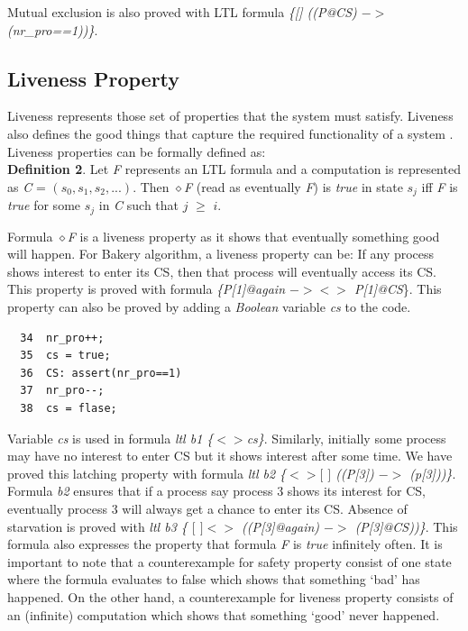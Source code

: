 \documentclass[conference]{IEEEtran}
\begin{document}
Mutual exclusion is also proved with LTL formula \emph{\{[] ((P@CS) $->$ (nr\_pro==1))\}}.

\subsection{Liveness Property}
Liveness represents those set of properties that the system must satisfy. Liveness also defines the good things that capture the 
required functionality of a system \cite{7}. Liveness properties can be formally defined as:\\
\textbf{Definition 2}. Let \emph{F} represents an LTL formula and a computation is represented as \emph{C} = $(s_0, s_1, s_2,...)$. 
Then $\diamond$\emph{F} (read as eventually \emph{F}) is \emph{true} in state $s_j$ iff \emph{F} is \emph{true} for some $s_j$ in \emph{C} such that 
$j$ $\geq$ $i$.

Formula $\diamond$\emph{F} is a liveness property as it shows that eventually something good will happen. For Bakery algorithm, a liveness property 
can be: If any process shows interest to enter its CS, then that process will eventually access its CS. This property is proved with 
formula \emph{\{P[1]@again  $-> <>$ P[1]@CS}\}. This property can also be proved by adding a \emph{Boolean} variable \emph{cs} to the code.
{\small \begin{verbatim}
  34  nr_pro++;
  35  cs = true;
  36  CS: assert(nr_pro==1)
  37  nr_pro--;
  38  cs = flase; 
\end{verbatim}}

Variable \emph{cs} is used in formula \emph{ltl b1 \{$<>$cs\}}. Similarly, initially some process may have no interest to enter CS but it shows 
interest after some time. We have proved this latching property with formula \emph{ltl b2 \{$<>[$ $]$ ((P[3]\@again) $->$ (p[3]\@CS))\}}. Formula 
\emph{b2} ensures that if a process say process 3 shows its interest for CS, eventually process 3 will always get a chance to enter its CS. 
Absence of starvation is proved with \emph{ltl b3 \{ $[$ $]<>$ ((P[3]@again) $->$ (P[3]@CS))\}}. This formula also expresses the property that 
formula \emph{F} is \emph{true} infinitely often. It is important to note that a counterexample for safety property consist of one state where the 
formula evaluates to false which shows that something ‘bad’ has happened. On the other hand, a counterexample for liveness property consists 
of an (infinite) computation which shows that something ‘good’ never happened.
\end{document}
